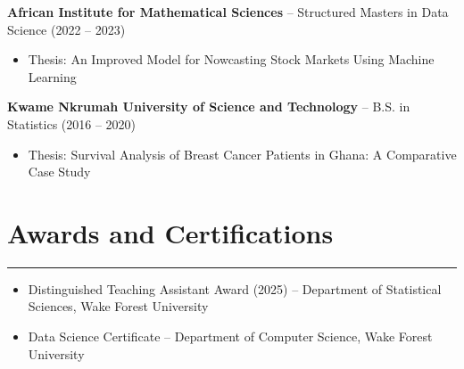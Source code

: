 \documentclass[a4paper,11pt]{article}
\begin{document}
\textbf{African Institute for Mathematical Sciences} -- Structured Masters in Data Science (2022 -- 2023)
\begin{itemize}
    \item Thesis: An Improved Model for Nowcasting Stock Markets Using Machine Learning
\end{itemize}

\textbf{Kwame Nkrumah University of Science and Technology} -- B.S. in Statistics (2016 -- 2020)
\begin{itemize}
    \item Thesis: Survival Analysis of Breast Cancer Patients in Ghana: A Comparative Case Study
\end{itemize}

\section*{Awards and Certifications}
\hrule \vspace{2mm}
\begin{itemize}
    \item Distinguished Teaching Assistant Award (2025) -- Department of Statistical Sciences, Wake Forest University
    \item Data Science Certificate -- Department of Computer Science, Wake Forest University
\end{itemize}
\end{document}
